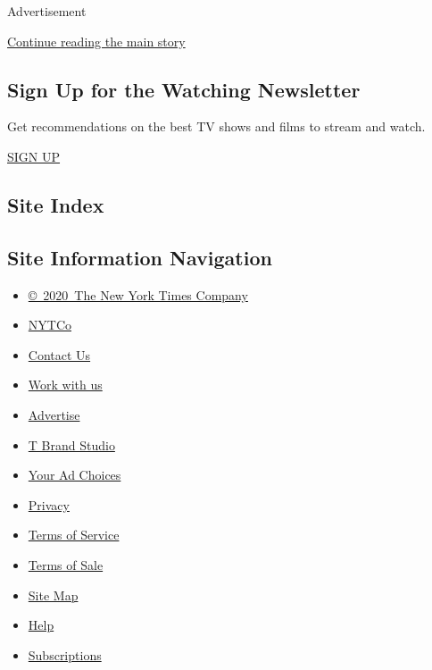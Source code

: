 Advertisement

\protect\hyperlink{after-mktg}{Continue reading the main story}

\hypertarget{sign-up-for-the-watching-newsletter}{%
\subsection{Sign Up for the Watching
Newsletter}\label{sign-up-for-the-watching-newsletter}}

Get recommendations on the best TV shows and films to stream and watch.

\href{/newsletters/signup/WG}{SIGN UP}

\hypertarget{site-index}{%
\subsection{Site Index}\label{site-index}}

\hypertarget{site-information-navigation}{%
\subsection{Site Information
Navigation}\label{site-information-navigation}}

\begin{itemize}
\tightlist
\item
  \href{https://help.nytimes3xbfgragh.onion/hc/en-us/articles/115014792127-Copyright-notice}{©~2020~The
  New York Times Company}
\end{itemize}

\begin{itemize}
\tightlist
\item
  \href{https://www.nytco.com/}{NYTCo}
\item
  \href{https://help.nytimes3xbfgragh.onion/hc/en-us/articles/115015385887-Contact-Us}{Contact
  Us}
\item
  \href{https://www.nytco.com/careers/}{Work with us}
\item
  \href{https://nytmediakit.com/}{Advertise}
\item
  \href{http://www.tbrandstudio.com/}{T Brand Studio}
\item
  \href{https://www.nytimes3xbfgragh.onion/privacy/cookie-policy\#how-do-i-manage-trackers}{Your
  Ad Choices}
\item
  \href{https://www.nytimes3xbfgragh.onion/privacy}{Privacy}
\item
  \href{https://help.nytimes3xbfgragh.onion/hc/en-us/articles/115014893428-Terms-of-service}{Terms
  of Service}
\item
  \href{https://help.nytimes3xbfgragh.onion/hc/en-us/articles/115014893968-Terms-of-sale}{Terms
  of Sale}
\item
  \href{https://spiderbites.nytimes3xbfgragh.onion}{Site Map}
\item
  \href{https://help.nytimes3xbfgragh.onion/hc/en-us}{Help}
\item
  \href{https://www.nytimes3xbfgragh.onion/subscription?campaignId=37WXW}{Subscriptions}
\end{itemize}
